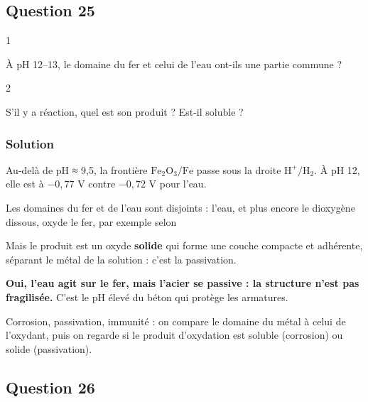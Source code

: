\documentclass[11pt,a4paper]{article}
\newcommand{\equationajustee}[1]{%
  \sbox{\boiteequation}{$\displaystyle #1$}%
  \ifdim\wd\boiteequation>\linewidth
    \[\resizebox{\linewidth}{!}{\usebox{\boiteequation}}\]%
  \else
    \[#1\]%
  \fi}
\begin{document}
\hypertarget{question-25}{%
\subsection{Question 25}\label{question-25}}

\begin{indication}{1}

À pH 12--13, le domaine du fer et celui de l'eau ont-ils une partie commune ?

\end{indication}

\begin{indication}{2}

S'il y a réaction, quel est son produit ? Est-il soluble ?

\end{indication}

\hypertarget{solution-24}{%
\subsubsection{Solution}\label{solution-24}}

Au-delà de pH ≈ 9,5, la frontière \(\mathrm{Fe_2O_3/Fe}\) passe sous la droite \(\mathrm{H^+/H_2}\). À pH 12, elle est à \(-0{,}77\) V contre \(-0{,}72\) V pour l'eau.

Les domaines du fer et de l'eau sont disjoints : l'eau, et plus encore le dioxygène dissous, oxyde le fer, par exemple selon

\equationajustee{2\mathrm{Fe} + 3\mathrm{H_2O}\to\mathrm{Fe_2O_3} + 3\mathrm{H_2}}

Mais le produit est un oxyde \textbf{solide} qui forme une couche compacte et adhérente, séparant le métal de la solution : c'est la passivation.

\textbf{Oui, l'eau agit sur le fer, mais l'acier se passive : la structure n'est pas fragilisée.} C'est le pH élevé du béton qui protège les armatures.

\begin{methode}

Corrosion, passivation, immunité : on compare le domaine du métal à celui de l'oxydant, puis on regarde si le produit d'oxydation est soluble (corrosion) ou solide (passivation).

\end{methode}

\hypertarget{question-26}{%
\subsection{Question 26}\label{question-26}}
\end{document}
